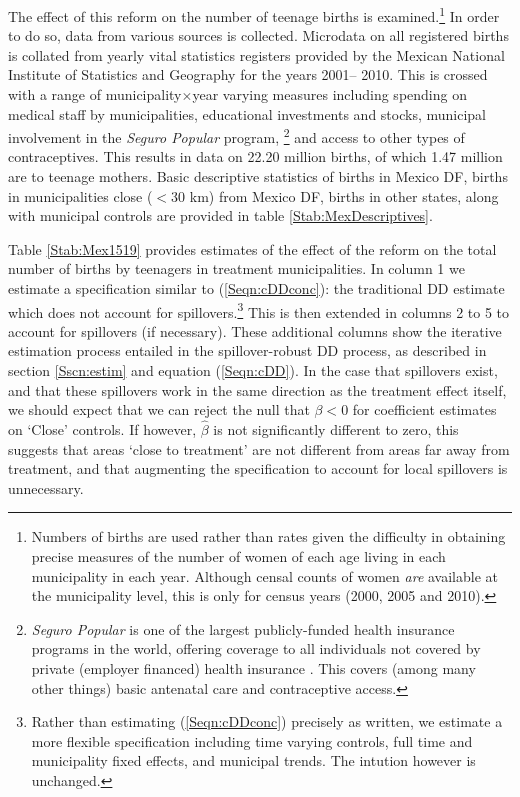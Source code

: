 The effect of this reform on the number of teenage births is examined.\footnote{%
Numbers of births are used rather than rates given the difficulty in obtaining
precise measures of the number of women of each age living in each municipality 
in each year.  Although censal counts of women \emph{are} available at the 
municipality level, this is only for census years (2000, 2005 and 2010).}  In 
order to do so, data from various sources is collected.  Microdata on all 
registered births is collated from yearly vital statistics registers provided by 
the Mexican National Institute of Statistics and Geography for the years 2001--%
2010. This is crossed with a range of municipality$\times$year varying measures 
including spending on medical staff by municipalities, educational investments
and stocks, municipal involvement in the \emph{Seguro Popular} program,%
\footnote{\emph{Seguro Popular} is one of the largest publicly-funded health 
insurance programs in the world, offering coverage to all individuals not covered 
by private (employer financed) health insurance \citep{BoschCampos2014}.  This 
covers (among many other things) basic antenatal care and contraceptive access.} 
and access to other types of contraceptives.  This results in data on 22.20 
million births, of which 1.47 million are to teenage mothers. Basic descriptive 
statistics of births in Mexico DF, births in municipalities close ($<$30 km) 
from Mexico DF, births in other states, along with municipal controls are provided 
in table \ref{Stab:MexDescriptives}.



Table \ref{Stab:Mex1519} provides estimates of the effect of the reform on
the total number of births by teenagers in treatment municipalities.  In 
column 1 we estimate a specification similar to (\ref{Seqn:cDDconc}): the 
traditional DD estimate which does not account for spillovers.\footnote{Rather 
than estimating (\ref{Seqn:cDDconc}) precisely as written, we estimate a more 
flexible specification including time varying controls, full time and
municipality fixed effects, and municipal trends.  The intution however is
unchanged.}  This is then extended in columns 2 to 5 to account for spillovers
(if necessary).  These additional columns show the iterative estimation 
process entailed in the spillover-robust DD process, as described in section 
\ref{Sscn:estim} and equation (\ref{Seqn:cDD}).  In the case that spillovers 
exist, and that these spillovers work in the same direction as the treatment 
effect itself, we should expect that we can reject the null that $\beta<0$ for
coefficient estimates on `Close' controls.  If however, $\hat\beta$ is not 
significantly different to zero, this suggests that areas `close to treatment' 
are not different from areas far away from treatment, and that augmenting the 
specification to account for local spillovers is unnecessary.

